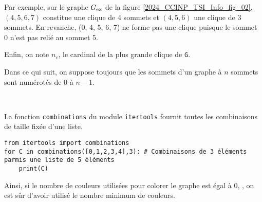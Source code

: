 Par exemple, sur le graphe ${G}_{\text{ex}}$ de la figure \ref{2024_CCINP_TSI_Info_fig_02}, $(4, 5, 6, 7)$ constitue une clique de 4 sommets et $(4, 5, 6)$ une clique de 3 sommets. En revanche, (0, 4, 5, 6, 7) ne forme pas une clique puisque le sommet 0 n'est pas relié au sommet 5.

Enfin, on note $n_c$, le cardinal de la plus grande clique de \lstinline{G}.


\ifprof
\begin{corrige}

\end{corrige}
\else
\fi

Dans ce qui suit, on suppose toujours que les sommets d'un graphe à $n$ sommets sont numérotés de 0 à $n-1$.

\ifprof
\begin{corrige}~\\ \vspace{-.5cm}

\end{corrige}
\else
\fi


La fonction \lstinline{combinations} du module \lstinline{itertools}%
fournit toutes les combinaisons de taille fixée d'une liste. 
\begin{lstlisting}
from itertools import combinations
for C in combinations([0,1,2,3,4],3): # Combinaisons de 3 éléments parmis une liste de 5 éléments
    print(C)
\end{lstlisting}

\ifprof
\begin{corrige}

\end{corrige}
\else
\fi

Ainsi, si le nombre de couleurs utilisées pour colorer le graphe est égal à 0, , on est sûr d'avoir utilisé le nombre minimum de couleurs.